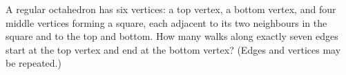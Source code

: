 A regular octahedron has six vertices: a top vertex, a bottom vertex, and four middle vertices forming a square, each adjacent to its two neighbours in the square and to the top and bottom. How many walks along exactly seven edges start at the top vertex and end at the bottom vertex? (Edges and vertices may be repeated.)
